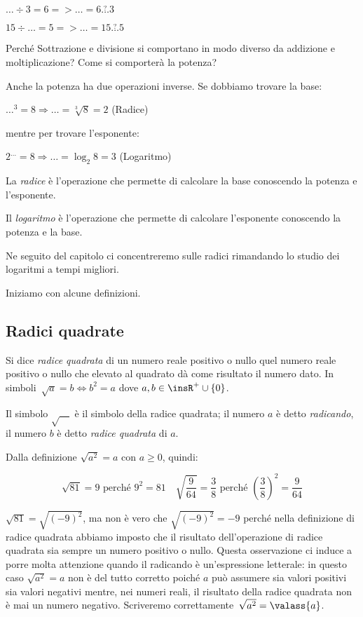 $\dots \div 3 = 6 => \dots = 6 \overset{?}{\dots} 3$

$15 \div \dots = 5 => \dots = 15 \overset{?}{\dots} 5$

Perché Sottrazione e divisione si comportano in modo diverso da addizione e 
moltiplicazione? Come si comporterà la potenza?

Anche la potenza ha due operazioni inverse. Se dobbiamo trovare la base:

$\dots ^3 = 8 \Rightarrow \dots = \sqrt[3]{8} = 2$ (Radice)

mentre per trovare l'esponente:

$2 ^{\dots} = 8 \Rightarrow \dots = \log_{2}{8} = 3$ (Logaritmo)

\begin{definizione}
La \emph{radice} è l'operazione che permette di calcolare la base conoscendo
la potenza e l'esponente.
\end{definizione}

\begin{definizione}
Il \emph{logaritmo} è l'operazione che permette di calcolare l'esponente
conoscendo la potenza e la base.
\end{definizione}

Ne seguito del capitolo ci concentreremo sulle radici rimandando lo studio
dei logaritmi a tempi migliori. 

Iniziamo con alcune definizioni.

\subsection{Radici quadrate}

\begin{definizione}
Si dice \emph{radice quadrata} di un numero reale positivo o nullo quel numero 
reale positivo o nullo che elevato al quadrato dà come risultato il numero dato.
In simboli~$\sqrt a=b \Leftrightarrow b^2=a$ dove $a,b\in \insR^{+} \cup \{0\}$.
\end{definizione}

Il simbolo $\sqrt{\quad}$ è il simbolo della radice quadrata; 
il numero $a$ è detto \emph{radicando}, 
il numero $b$ è detto \emph{radice quadrata} di $a$.

Dalla definizione $\sqrt{a^2}=a$ con $a\ge 0$, quindi: 

$$\sqrt{81}=9 \text{ perché } 9^2=81 \quad 
\sqrt{\frac {9}{64}}=\frac{3}{8}
\text{ perché } \left(\frac 3 8\right)^2=\frac 9{64}$$

\osservazione $\sqrt{81}=\sqrt{(-9)^2}$, ma non è vero che 
$\sqrt{(-9)^2}=-9$ perché nella definizione di radice quadrata abbiamo imposto 
che il risultato dell'operazione di radice quadrata sia sempre un numero 
positivo o nullo.
Questa osservazione ci induce a porre molta attenzione quando il radicando è 
un'espressione letterale: in questo caso $\sqrt{a^2}=a$ non è del tutto 
corretto poiché $a$ può assumere sia valori positivi sia valori negativi
mentre, nei numeri reali, il risultato della radice quadrata non è mai un 
numero negativo. 
Scriveremo correttamente~$\sqrt{a^2}=\valass{a}$.

